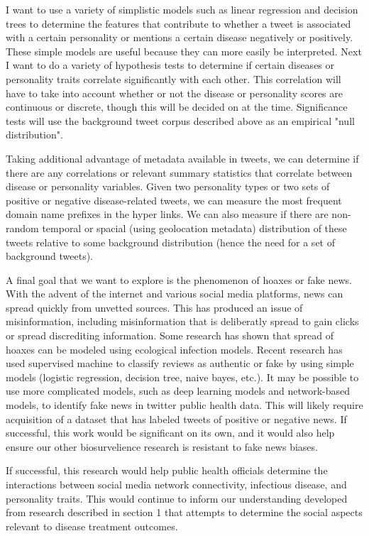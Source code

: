 I want to use a variety of simplistic models such as linear regression and decision trees to determine the features that contribute to whether a tweet is associated with a certain personality or mentions a certain disease negatively or positively. These simple models are useful because they can more easily be interpreted. Next I want to do a variety of hypothesis tests to determine if certain diseases or personality traits correlate significantly with each other. This correlation will have to take into account whether or not the disease or personality scores are continuous or discrete, though this will be decided on at the time. Significance tests will use the background tweet corpus described above as an empirical "null distribution".

Taking additional advantage of metadata available in tweets, we can determine if there are any correlations or relevant summary statistics that correlate between disease or personality variables. Given two personality types or two sets of positive or negative disease-related tweets, we can measure the most frequent domain name prefixes in the hyper links. We can also measure if there are non-random temporal or spacial (using geolocation metadata) distribution of these tweets relative to some background distribution (hence the need for a set of background tweets).

A final goal that we want to explore is the phenomenon of hoaxes or fake news. With the advent of the internet and various social media platforms, news can spread quickly from unvetted sources. This has produced an issue of misinformation, including misinformation that is deliberatly spread to gain clicks or spread discrediting information. Some research has shown that spread of hoaxes can be modeled using ecological infection models\cite{tambuscio2015fact}. Recent research has used supervised machine to classify reviews as authentic or fake\cite{banerjee2015using} by using simple models (logistic regression, decision tree, naive bayes, etc.). It may be possible to use more complicated models, such as deep learning models and network-based models, to identify fake news in twitter public health data. This will likely require acquisition of a dataset that has labeled tweets of positive or negative news. If successful, this work would be significant on its own, and it would also help ensure our other biosurvelience research is resistant to fake news biases.

If successful, this research would help public health officials determine the interactions between social media network connectivity, infectious disease, and personality traits. This would continue to inform our understanding developed from research described in section 1 that attempts to determine the social aspects relevant to disease treatment outcomes.

